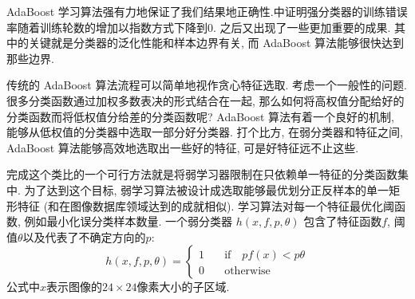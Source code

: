 \documentclass[a4paper,utf8,11pt, onecolumn]{ctexart}
\begin{document}
AdaBoost 学习算法强有力地保证了我们结果地正确性.\citet{schapire1997boosting}中证明强分类器的训练错误率随着训练轮数的增加以指数方式下降到$0$. 之后又出现了一些更加重要的成果. 其中的关键就是分类器的泛化性能和样本边界有关, 而 AdaBoost 算法能够很快达到那些边界.

传统的 AdaBoost 算法流程可以简单地视作贪心特征选取. 考虑一个一般性的问题. 很多分类函数通过加权多数表决的形式结合在一起, 那么如何将高权值分配给好的分类函数而将低权值分给差的分类函数呢? 
AdaBoost 算法有着一个良好的机制, 能够从低权值的分类器中选取一部分好分类器. 打个比方, 在弱分类器和特征之间, AdaBoost 算法能够高效地选取出一些好的特征, 可是好特征远不止这些.

完成这个类比的一个可行方法就是将弱学习器限制在只依赖单一特征的分类函数集中. 为了达到这个目标, 弱学习算法被设计成选取能够最优划分正反样本的单一矩形特征 (和\citet{tieu2000boosting}在图像数据库领域达到的成就相似). 学习算法对每一个特征最优化阈函数, 例如最小化误分类样本数量. 一个弱分类器 $h(x,f,p,\theta)$ 包含了特征函数$f$, 阈值$\theta$以及代表了不确定方向的$p$:
\[
    h(x,f,p,\theta) =
    \begin{cases}
        1 &\quad\text{if}\quad pf(x)<p\theta \\
        0 &\quad\text{otherwise}
    \end{cases}
\]
公式中$x$表示图像的$24\times24$像素大小的子区域.
\end{document}
